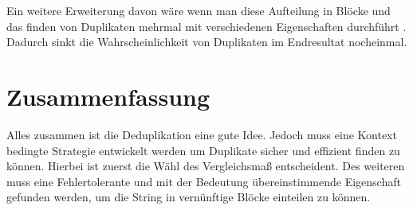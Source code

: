 \documentclass[sigconf]{acmart}
\begin{document}
Ein weitere Erweiterung davon wäre wenn man diese
Aufteilung in Blöcke und das finden von Duplikaten
mehrmal mit verschiedenen Eigenschaften durchführt 
\cite[Vlg. S. 11]{elmagarmid1}.
Dadurch sinkt die Wahrscheinlichkeit von Duplikaten
im Endresultat nocheinmal.

\section*{Zusammenfassung}
Alles zusammen ist die Deduplikation eine gute Idee.
Jedoch muss eine Kontext bedingte Strategie entwickelt
werden um Duplikate sicher und effizient finden zu 
können. Hierbei ist zuerst die Wähl des Vergleichsmaß
entscheident. Des weiteren muss eine Fehlertolerante
und mit der Bedeutung übereinstimmende Eigenschaft 
gefunden werden, um die String in vernünftige Blöcke 
einteilen zu können.



\end{document}
